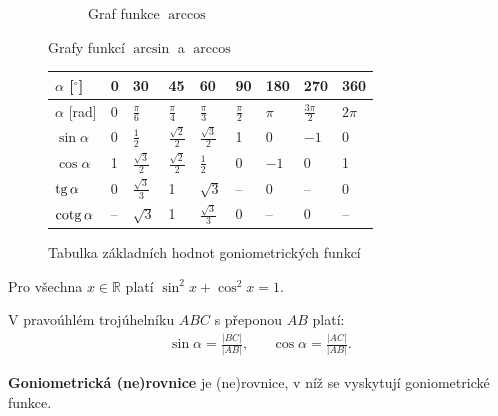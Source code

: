 \begin{figure}[h]
\begin{subfigure}{.45\textwidth}
         \caption{Graf funkce $\arccos$}
	\end{subfigure}
	\caption{Grafy funkcí $\arcsin$ a $\arccos$}
\end{figure}

\begin{figure}[h]
\centering
    \begin{tabularx}{\textwidth}{| p{} || p{} | p{} |
    p{} | p{} | p{} | p{} | p{}
    | p{} |}
    \hline
    $\alpha$ [$^\circ$] & 0 & 30 & 45 & 60 & 90 & 180 & 270 & 360 \\
    \hline
    $\alpha$ [rad] & 0 & $\frac{\pi}{6}$ & $\frac{\pi}{4}$ & $\frac{\pi}{3}$ & $\frac{\pi}{2}$ & $\pi$ & $\frac{3\pi}{2}$ & $2\pi$\\
    \hline
    $\sin \alpha$ & 0 & $\frac{1}{2}$ & $\frac{\sqrt{2}}{2}$ & $\frac{\sqrt{3}}{2}$ & 1 & 0 & $-1$ & 0\\
    \hline
    $\cos \alpha$ & 1 & $\frac{\sqrt{3}}{2}$ & $\frac{\sqrt{2}}{2}$ & $\frac{1}{2}$ & 0 & $-1$ & 0 & 1\\
    \hline
    $\operatorname{tg} \alpha$ & 0 & $\frac{\sqrt{3}}{3}$ & 1 & $\sqrt{3}$ & -- & 0 & -- & 0\\
    \hline
    $\operatorname{cotg} \alpha$ & -- & $\sqrt{3}$ & 1 & $\frac{\sqrt{3}}{3}$ & 0 & -- & 0 & --\\
    \hline
    \end{tabularx}
    \caption{Tabulka základních hodnot goniometrických funkcí}
\end{figure}

\begin{veta}
  Pro všechna $ x \in \mathbb{R} $ platí $\sin^2 x + \cos^2 x = 1$.
\end{veta}

\begin{veta}
    V pravoúhlém trojúhelníku $ABC$ s přeponou $AB$ platí:
    \begin{align*}
        \sin \alpha = \frac{ |BC| }{ |AB| }, & & \cos \alpha = \frac{|AC|}{|AB|}.
    \end{align*}
\end{veta}

\begin{pozn}
    \textbf{Goniometrická (ne)rovnice} je (ne)rovnice, v níž se vyskytují goniometrické funkce.
\end{pozn}
